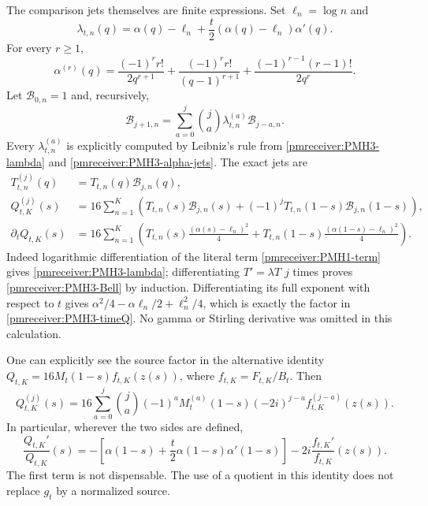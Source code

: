 \documentclass[11pt]{article}
\begin{document}
The comparison jets themselves are finite expressions. Set
$\ell_n=\log n$ and
\begin{equation}\label{pmreceiver:PMH3-lambda}
 \lambda_{t,n}(q)=\alpha(q)-\ell_n
       +\frac t2(\alpha(q)-\ell_n)\alpha'(q).
\end{equation}
For every $r\ge1$,
\begin{equation}\label{pmreceiver:PMH3-alpha-jets}
 \alpha^{(r)}(q)=\frac{(-1)^r r!}{2q^{r+1}}
 +\frac{(-1)^r r!}{(q-1)^{r+1}}
 +\frac{(-1)^{r-1}(r-1)!}{2q^r}.
\end{equation}
Let $\mathcal B_{0,n}=1$ and, recursively,
\begin{equation}\label{pmreceiver:PMH3-Bell}
 \mathcal B_{j+1,n}
 =\sum_{a=0}^j\binom ja\lambda_{t,n}^{(a)}\mathcal B_{j-a,n}.
\end{equation}
Every $\lambda_{t,n}^{(a)}$ is explicitly computed by Leibniz's rule
from \eqref{pmreceiver:PMH3-lambda} and \eqref{pmreceiver:PMH3-alpha-jets}. The exact jets are
\begin{align}
 T_{t,n}^{(j)}(q)&=T_{t,n}(q)\mathcal B_{j,n}(q),
 \label{pmreceiver:PMH3-term-jets}\\
 Q_{t,K}^{(j)}(s)&=16\sum_{n=1}^K
 \left(T_{t,n}(s)\mathcal B_{j,n}(s)
 +(-1)^jT_{t,n}(1-s)\mathcal B_{j,n}(1-s)\right),
 \label{pmreceiver:PMH3-Qjets}\\
 \partial_tQ_{t,K}(s)&=16\sum_{n=1}^K
 \left(T_{t,n}(s)\frac{(\alpha(s)-\ell_n)^2}{4}
 +T_{t,n}(1-s)\frac{(\alpha(1-s)-\ell_n)^2}{4}\right).
 \label{pmreceiver:PMH3-timeQ}
\end{align}
Indeed logarithmic differentiation of the literal term
\eqref{pmreceiver:PMH1-term} gives \eqref{pmreceiver:PMH3-lambda}; differentiating
$T'=\lambda T$ $j$ times proves \eqref{pmreceiver:PMH3-Bell} by induction.
Differentiating its full exponent with respect to $t$ gives
$\alpha^2/4-\alpha\ell_n/2+\ell_n^2/4$, which is exactly the
factor in \eqref{pmreceiver:PMH3-timeQ}. No gamma or Stirling derivative was
omitted in this calculation.

One can explicitly see the source factor in the alternative
identity $Q_{t,K}=16M_t(1-s)f_{t,K}(z(s))$, where
$f_{t,K}=F_{t,K}/B_t$. Then
\begin{equation}\label{pmreceiver:PMH3-Bjet}
 Q_{t,K}^{(j)}(s)=16\sum_{a=0}^j\binom ja(-1)^a
 M_t^{(a)}(1-s)(-2i)^{j-a}f_{t,K}^{(j-a)}(z(s)).
\end{equation}
In particular, wherever the two sides are defined,
\begin{equation}\label{pmreceiver:PMH3-logB}
 \frac{Q_{t,K}'}{Q_{t,K}}(s)
 =-\left[\alpha(1-s)+\frac t2\alpha(1-s)\alpha'(1-s)\right]
       -2i\frac{f_{t,K}'}{f_{t,K}}(z(s)).
\end{equation}
The first term is not dispensable. The use of a quotient in this
identity does not replace $g_t$ by a normalized source.
\end{document}
